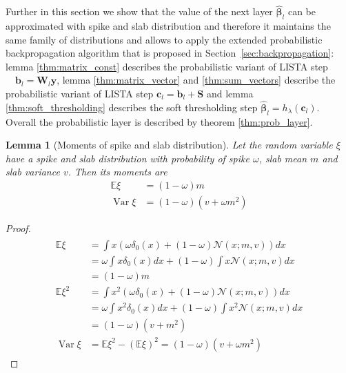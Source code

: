 \documentclass[letterpaper]{article}
\newtheorem{lemma}{Lemma}
\begin{document}
Further in this section we show that the value of the next layer $\widehat{\boldsymbol\beta}_l$ can be approximated with spike and slab distribution and therefore it maintains the same family of distributions and allows to apply the extended probabilistic backpropagation algorithm that is proposed in Section~\ref{sec:backpropagation}: lemma \ref{thm:matrix_const} describes the probabilistic variant of LISTA step $\quad \mathbf{b}_l = \mathbf{W}_l \mathbf{y}$, lemma \ref{thm:matrix_vector} and \ref{thm:sum_vectors} describe the probabilistic variant of LISTA step $ \mathbf{c}_l = \mathbf{b}_l +\mathbf{S}$ and lemma \ref{thm:soft_thresholding} describes the soft thresholding step $\widehat{\boldsymbol\beta}_{l} = h_\lambda(\mathbf{c}_l)$. Overall the probabilistic layer is described by theorem \ref{thm:prob_layer}.

\begin{lemma}[Moments of spike and slab distribution]
\label{thm:moments_spsl}
Let the random variable $\xi$ have a spike and slab distribution with probability of spike $\omega$, slab mean $m$ and slab variance $v$. Then its moments are
\begin{subequations}
\begin{align}
\mathbb{E}\xi &= (1-\omega)m \\
\operatorname{Var}\xi & = (1-\omega)(v + \omega m^2)
\end{align}
\end{subequations}
\end{lemma}

\begin{proof}
\begin{align*}
\begin{split}
\mathbb{E}\xi &= \int x (\omega \delta_0(x) + (1 - \omega)\mathcal{N}(x; m, v))dx \\
& = \omega \int x \delta_0(x)dx + (1 - \omega)\int x \mathcal{N}(x; m, v)dx \\
& = (1-\omega)m \\
\mathbb{E}\xi^2 &= \int x^2 (\omega \delta_0(x) + (1 - \omega)\mathcal{N}(x; m, v))dx \\
& = \omega \int x^2 \delta_0(x)dx + (1 - \omega)\int x^2 \mathcal{N}(x; m, v)dx \\
& = (1-\omega)(v + m^2) \\
\operatorname{Var}\xi &= \mathbb{E}\xi^2 - \left(\mathbb{E}\xi\right)^2 = (1-\omega)(v + \omega m^2)
\end{split}
\end{align*}
\end{proof}
\end{document}
